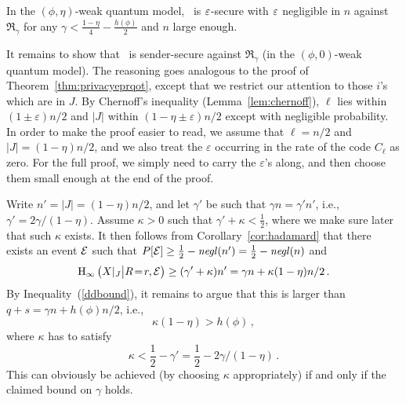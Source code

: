 \begin{theorem}\label{thm:BBqotsec}
  In the $(\phi,\eta)$-weak quantum model, \BBqot\ is $\varepsilon$-secure
  with $\varepsilon$ negligible in $n$ against $\mathfrak{R}_{\gamma}$ for
  any $\gamma < \frac{1-\eta}{4} - \frac{h(\phi)}{2}$ and $n$ large
  enough.
\end{theorem}
\begin{sketch}%
  It remains to show that \BBeprqot\ is sender-secure against
  $\mathfrak{R}_{\gamma}$ (in the $(\phi,0)$-weak quantum model).  The
  reasoning goes analogous to the proof of
  Theorem~\ref{thm:privacyeprqot}, except that we restrict our
  attention to those $i$'s which are in $J$.  By Chernoff's inequality
  (Lemma~\ref{lem:chernoff}), $\ell$ lies within $(1\pm\varepsilon)n/2$ and $|J|$
  within $(1-\eta\pm\varepsilon)n/2$ except with negligible
  probability. In order to make the proof easier to read, we assume
  that $\ell = n/2$ and $|J| = (1-\eta)n/2$, and we also treat the
  $\varepsilon$ occurring in the rate of the code $C_{\ell}$ as zero.
  For the full proof, we simply need to carry the $\varepsilon$'s
  along, and then choose them small enough at the end of the proof.

Write $n' = |J| = (1-\eta)n/2$, and let $\gamma'$ be such that $\gamma n =
  \gamma' n'$, i.e., $\gamma' = 2\gamma/(1-\eta)$. 
Assume $\kappa > 0$ such that $\gamma' + \kappa < \frac12$, where we make sure later that such $\kappa$ exists. 
It then follows from Corollary~\ref{cor:hadamard} that there exists an 
event $\mathcal{E}$ such that $P[\mathcal{E}] \geq \frac12 - \mathit{negl}({n'}) = \frac12 - \mathit{negl}({n})$ and 
$$
\operatorname{H}_{\infty}\big(X|_J \big| R\!=\!r,\mathcal{E}\big) \geq (\gamma' +
 \kappa) n' 
 = \gamma n + \kappa (1-\eta)n/2 \, .
$$
By Inequality~(\ref{ddbound}), it remains to argue that this is larger than $q + s = \gamma n + h(\phi) n/2$, i.e., 
$$
\kappa (1-\eta) > h(\phi) \, ,
$$ 
where $\kappa$ has to satisfy 
$$
\kappa < \frac12 -
\gamma' = \frac12 - 2\gamma/(1-\eta) \, .
$$
This can obviously be achieved (by choosing $\kappa$ appropriately) if and only if
the claimed bound on $\gamma$ holds. 
\end{sketch}



